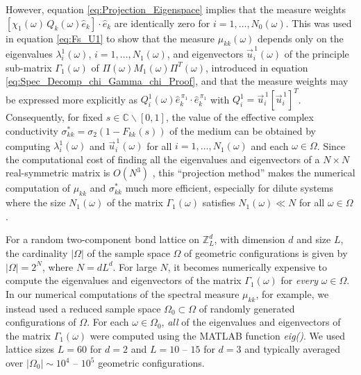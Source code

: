 \documentclass{cmslatex}
\begin{document}
However, equation \eqref{eq:Projection_Eigenspace} implies that the
measure weights $[\chi_1(\omega)\,Q_k(\omega)\hat{e}_k]\cdot\hat{e}_k$ are 
identically zero for $i=1,\ldots,N_0(\omega)$. This was used in equation
\eqref{eq:Fs_U1} to show that the measure $\mu_{kk}(\omega)$ depends only on
the eigenvalues $\lambda^1_i(\omega)$, $i=1,\ldots,N_1(\omega)$, and eigenvectors
$\vec{u}^{\,1}_i(\omega)$ of the principle sub-matrix $\Gamma_1(\omega)$ of
$\Pi(\omega)M_1(\omega)\Pi^T(\omega)$, introduced in 
equation \eqref{eq:Spec_Decomp_chi_Gamma_chi_Proof}, and that the
measure weights may be expressed more explicitly as
$Q^1_i(\omega)\hat{e}_k^{\,\pi_1}\cdot\hat{e}_k^{\,\pi_1}$ with 
$Q^1_i=\vec{u}^{\,1}_i[\vec{u}^{\,1}_i]^T$.  Consequently,
for fixed $s\in\mathbb{C}\backslash[0,1]$, the value of
the effective complex conductivity $\sigma^*_{kk}=\sigma_2(1-F_{kk}(s))$ of
the medium can be obtained by computing $\lambda^1_i(\omega)$ and
$\vec{u}^{\,1}_i(\omega)$ for all $i=1,\ldots,N_1(\omega)$ and each $\omega\in\Omega$. Since the
computational cost of finding all the eigenvalues and eigenvectors of
a $N\times N$ real-symmetric matrix is $O(N^3)$ \cite{Demmel:1997}, this ``projection
method'' makes the numerical computation of $\mu_{kk}$ and $\sigma^*_{kk}$
much more efficient, especially for dilute systems where the size
$N_1(\omega)$ of the matrix $\Gamma_1(\omega)$ satisfies $N_1(\omega)\ll N$ for all $\omega\in\Omega$.   


For a random two-component bond lattice on $\mathbb{Z}^d_L$, with
dimension $d$ and size $L$, the cardinality $|\Omega|$ of the sample space
$\Omega$ of geometric configurations is 
given by $|\Omega|=2^N$, where $N=dL^d$. For large $N$, it
becomes numerically expensive to compute the eigenvalues and
eigenvectors of the matrix $\Gamma_1(\omega)$ for \emph{every} $\omega\in\Omega$. In our
numerical computations of the spectral measure $\mu_{kk}$, for example,
we instead used a reduced sample space $\Omega_0\subset\Omega$ of randomly generated
configurations of $\Omega$. For each $\omega\in\Omega_0$, \emph{all} of the eigenvalues
and eigenvectors of the matrix $\Gamma_1(\omega)$ were computed using the MATLAB
function \emph{eig()}. We used lattice sizes $L=60$ for $d=2$ and
$L=10$ -- $15$ for  
$d=3$ and typically averaged over $|\Omega_0|\sim10^4$ -- $10^5$ geometric
configurations. 
\end{document}
